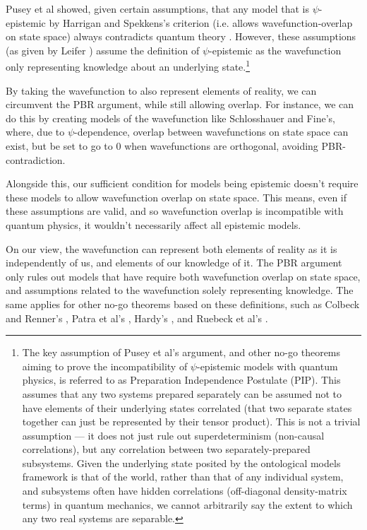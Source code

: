 \documentclass[superscriptaddress, floatfix,nofootinbib,12pt]{revtex4-2}
\begin{document}
Pusey et al showed, given certain assumptions, that any model that is $\psi$-epistemic by Harrigan and Spekkens's criterion (i.e. allows wavefunction-overlap on state space) always contradicts quantum theory \cite{Pusey2012OnTheReality}. However, these assumptions (as given by Leifer \cite{Leifer2014Review}) assume the definition of $\psi$-epistemic as the wavefunction only representing knowledge about an underlying state.\footnote{The key assumption of Pusey et al's argument, and other no-go theorems aiming to prove the incompatibility of $\psi$-epistemic models with quantum physics, is referred to as Preparation Independence Postulate (PIP). This assumes that any two systems prepared separately can be assumed not to have elements of their underlying states correlated (that two separate states together can just be represented by their tensor product). This is not a trivial assumption \cite{Lewis2012Compatible} --- it does not just rule out superdeterminism (non-causal correlations), but any correlation between two separately-prepared subsystems. Given the underlying state posited by the ontological models framework is that of the world, rather than that of any individual system, and subsystems often have hidden correlations (off-diagonal density-matrix terms) in quantum mechanics, we cannot arbitrarily say the extent to which any two real systems are separable.}

By taking the wavefunction to also represent elements of reality, we can circumvent the PBR argument, while still allowing overlap. For instance, we can do this by creating models of the wavefunction like Schlosshauer and Fine's, where, due to $\psi$-dependence, overlap between wavefunctions on state space can exist, but be set to go to 0 when wavefunctions are orthogonal, avoiding PBR-contradiction.

Alongside this, our sufficient condition for models being epistemic doesn't require these models to allow wavefunction overlap on state space. This means, even if these assumptions are valid, and so wavefunction overlap is incompatible with quantum physics, it wouldn't necessarily affect all epistemic models.

On our view, the wavefunction can represent both elements of reality as it is independently of us, and elements of our knowledge of it. The PBR argument only rules out models that have require both wavefunction overlap on state space, and assumptions related to the wavefunction solely representing knowledge. The same applies for other no-go theorems based on these definitions, such as Colbeck and Renner's \cite{Colbeck2012Correspondence}, Patra et al's \cite{Patra2013NoGo}, Hardy's \cite{Hardy2013QStatesReal}, and Ruebeck et al's \cite{Ruebeck2020Epistemic}.
\end{document}
